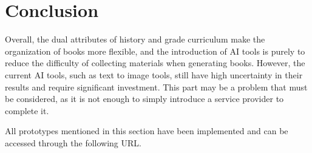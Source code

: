 \section{Conclusion}
Overall, the dual attributes of history and grade curriculum make the organization of books more flexible, and the introduction of AI tools is purely to reduce the difficulty of collecting materials when generating books. 
However, the current AI tools, such as text to image tools, still have high uncertainty in their results and require significant investment. 
This part may be a problem that must be considered, as it is not enough to simply introduce a service provider to complete it.

All prototypes mentioned in this section have been implemented and can be accessed through the following URL\autocite{Page1wh37:online}.